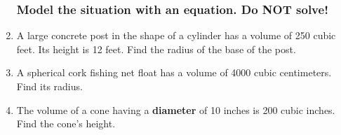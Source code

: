 \documentclass[12pt, twoside]{article}
\begin{document}
\begin{enumerate}
\subsubsection*{Model the situation with an equation. \hfill Do NOT solve!}

  \item A large concrete post in the shape of a cylinder has a volume of 250 cubic feet. Its height is 12 feet. Find the radius of the base of the post. \vspace{2cm}

  \item A spherical cork fishing net float has a volume of 4000 cubic centimeters. Find its radius. \vspace{2cm}

  \item The volume of a cone having a \textbf{diameter} of 10 inches is 200 cubic inches. Find the cone's height.


\end{enumerate}
\end{document}
